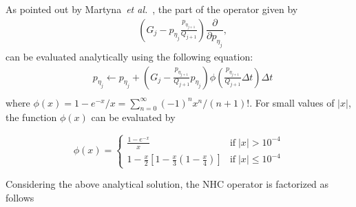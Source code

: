 \documentclass[aip,jcp,reprint,amsmath,amssymb]{revtex4-1}
\newcommand{\diff}[2]{\dfrac{\partial #1}{\partial #2}} %
\begin{document}
As pointed out by Martyna~\textit{et al.}~\cite{Martyna1996}, the part of the operator given by 
\begin{align*}
&\left(G_j - p_{\eta_j} \frac{p_{\eta_{j+1}}}{Q_{j+1}}\right) \diff{}{p_{\eta_j}},
\end{align*}
can be evaluated analytically using the following equation:
\begin{equation}
\label{eq:p_eta}
\begin{split}
&p_{\eta_j} \leftarrow p_{\eta_j} + \left( G_j - \frac{p_{\eta_{j+1}}}{Q_{j+1}} p_{\eta_j} \right) \phi\left( \frac{p_{\eta_{j+1}}}{Q_{j+1}} \Delta t \right) \Delta t \\
\end{split}
\end{equation}
where $\phi(x) = 1-e^{-x}/x = \sum_{n=0}^\infty (-1)^n x^n/(n+1)!$. For small values of $|x|$, the function $\phi(x)$ can be evaluated by

\begin{equation}
\label{eq:phi}
\phi(x) = \begin{cases}
\frac{1-e^{-x}}{x} & \text{if} \; |x| > 10^{-4} \\
1 - \frac{x}{2}\left[1 - \frac{x}{3}\left(1 - \frac{x}{4}\right) \right] & \text{if} \; |x| \leq 10^{-4}
\end{cases}
\end{equation}

Considering the above analytical solution, the NHC operator is factorized as follows
\end{document}
